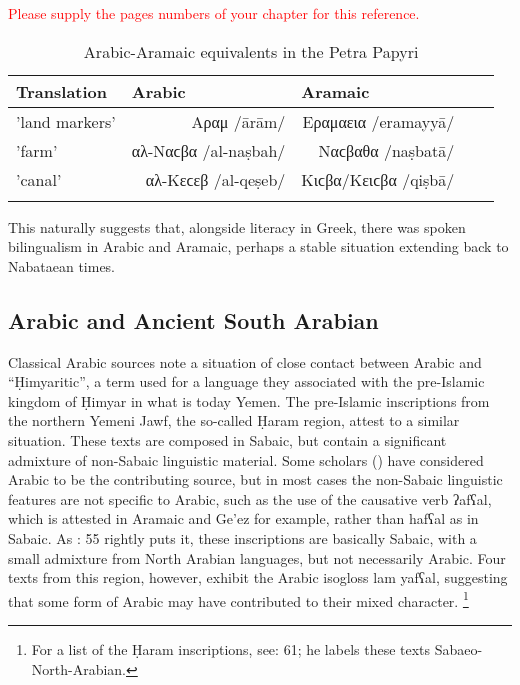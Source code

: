 \documentclass[output=paper]{langsci/langscibook}
\begin{document}
\begin{table}[H]
\caption{Arabic-Aramaic equivalents in the Petra Papyri} \citet{Al-Jallad2018Petra} \textcolor{red}{Please supply the pages numbers of your chapter for this reference.} \\
\begin{tabular}{lllll}
\lsptoprule
Translation & Arabic & Aramaic \\
\midrule
'land markers' & \multicolumn{1}{r}{Αραμ /ārām/} & \multicolumn{1}{r}{Εραμαεια /eramayyā/}  \\
'farm' & \multicolumn{1}{r}{αλ-Ναϲβα /al-naṣbah/} & \multicolumn{1}{r}{Ναϲβαθα /naṣbatā/}  \\
'canal' & \multicolumn{1}{r}{αλ-Κεϲεβ /al-qeṣeb/} & \multicolumn{1}{r}{Κιϲβα/Κειϲβα /qiṣbā/}  \\
\lspbottomrule
\end{tabular}
\end{table}

This naturally suggests that, alongside literacy in Greek, there was spoken bilingualism in Arabic and Aramaic, perhaps a stable situation extending back to Nabataean times. 

\subsection{Arabic and Ancient South Arabian}
Classical Arabic sources note a situation of close contact between Arabic and “Ḥimyaritic”, a term used for a language they associated with the pre-Islamic kingdom of Ḥimyar in what is today Yemen. The pre-Islamic inscriptions from the northern Yemeni Jawf, the so-called Ḥaram region, attest to a similar situation. These texts are composed in Sabaic, but contain a significant admixture of non-Sabaic linguistic material. Some scholars (\citet{Robin2001}) have considered Arabic to be the contributing source, but in most cases the non-Sabaic linguistic features are not specific to Arabic, such as the use of the causative verb ʔafʕal, which is attested in Aramaic and Ge’ez for example, rather than hafʕal as in Sabaic. As \citet{Macdonald2000}: 55 rightly puts it, these inscriptions are basically Sabaic, with a small admixture from North Arabian languages, but not necessarily Arabic. Four texts from this region, however, exhibit the Arabic isogloss lam yafʕal, suggesting that some form of Arabic may have contributed to their mixed character. \footnote{For a list of the Ḥaram inscriptions, see\citep{macdonald2000}: 61; he labels these texts Sabaeo-North-Arabian.}   
\end{document}
